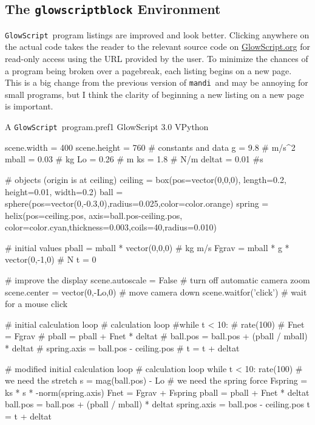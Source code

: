 \documentclass{article}
\newcommand*{\mandi}{\texttt{mandi}}
\newcommand*{\GlowScript}{\texttt{GlowScript}}
\begin{document}
\subsection{The \texttt{glowscriptblock} Environment}
\GlowScript\ program listings are improved and look better. Clicking anywhere on the actual 
code takes the reader to the relevant source code on \href{https://www.glowscript.org}{GlowScript.org}
for read-only access using the URL provided by the user. To minimize the chances of a program being 
broken over a pagebreak, each listing begins on a new page. This is a big change from the previous 
version of \mandi\ and may be annoying for small programs, but I think the clarity of beginning a
new listing on a new page is important.

\begin{glowscriptblock}{A \GlowScript\ program.}{pref1}
GlowScript 3.0 VPython

scene.width = 400
scene.height = 760
# constants and data
g = 9.8       # m/s^2
mball = 0.03  # kg
Lo = 0.26     # m
ks = 1.8      # N/m
deltat = 0.01 #s 

# objects (origin is at ceiling)
ceiling = box(pos=vector(0,0,0), length=0.2, height=0.01, width=0.2)
ball = sphere(pos=vector(0,-0.3,0),radius=0.025,color=color.orange)
spring = helix(pos=ceiling.pos, axis=ball.pos-ceiling.pos,
         color=color.cyan,thickness=0.003,coils=40,radius=0.010)

# initial values
pball = mball * vector(0,0,0)      # kg m/s
Fgrav = mball * g * vector(0,-1,0) # N
t = 0

# improve the display
scene.autoscale = False        # turn off automatic camera zoom
scene.center = vector(0,-Lo,0) # move camera down
scene.waitfor('click')         # wait for a mouse click

# initial calculation loop
# calculation loop
#while t < 10:
#    rate(100)
#    Fnet = Fgrav
#    pball = pball + Fnet * deltat
#    ball.pos = ball.pos + (pball / mball) * deltat
#    spring.axis = ball.pos - ceiling.pos
#    t = t + deltat
    
# modified initial calculation loop
# calculation loop
while t < 10:
    rate(100)
    # we need the stretch
    s = mag(ball.pos) - Lo
    # we need the spring force
    Fspring = ks * s * -norm(spring.axis)
    Fnet = Fgrav + Fspring
    pball = pball + Fnet * deltat
    ball.pos = ball.pos + (pball / mball) * deltat
    spring.axis = ball.pos - ceiling.pos
    t = t + deltat
\end{glowscriptblock}
\end{document}
